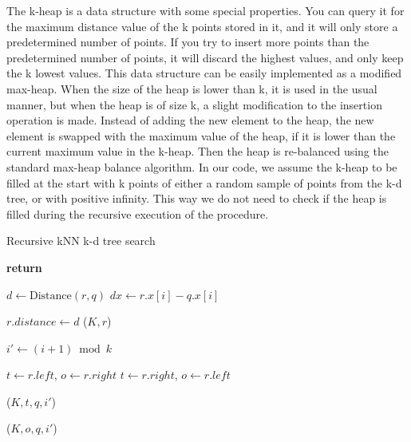 The k-heap is a data structure with some special properties. You can query it for the maximum distance value of the k points stored in it, and it will only store a predetermined number of points. If you try to insert more points than the predetermined number of points, it will discard the highest values, and only keep the k lowest values. This data structure can be easily implemented as a modified max-heap\citep[Chapter 6]{Cormen:2001}. When the size of the heap is lower than k, it is used in the usual manner, but when the heap is of size k, a slight modification to the insertion operation is made. Instead of adding the new element to the heap, the new element is swapped with the maximum value of the heap, if it is lower than the current maximum value in the k-heap. Then the heap is re-balanced using the standard max-heap balance algorithm. In our code, we assume the k-heap to be filled at the start with k points of either a random sample of points from the k-d tree, or with positive infinity. This way we do not need to check if the heap is filled during the recursive execution of the procedure.

\begin{algorithm}
\caption{Recursive kNN k-d tree search}
\label{alg:recursive_knn_kd_tree_search}
\begin{algorithmic}
         
            \State \textbf{return}
        \EndIf

        \State $d \gets \text{Distance}(r, q)$
        \State $dx \gets r.x[i] - q.x[i]$

         
            \State $r.distance \gets d$
            \State {}($K, r$)
        \EndIf

        \State $i' \gets (i + 1) \bmod k$ 

          
            \State $t \gets r.left$, $o \gets r.right$
        \Else
            \State $t \gets r.right$, $o \gets r.left$
        \EndIf

        \State {} ($K, t, q, i'$)

         
            \State {}($K, o, q, i'$)
        \EndIf
    \EndProcedure
\end{algorithmic}
\end{algorithm}

